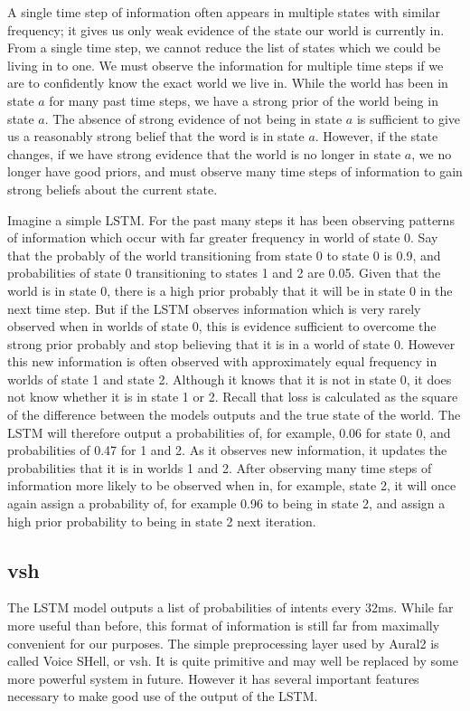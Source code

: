 \documentclass[conference]{IEEEtran}
\begin{document}
A single time step of information often appears in multiple states with similar frequency; it gives us only weak evidence of the state our world is currently in.
From a single time step, we cannot reduce the list of states which we could be living in to one.
We must observe the information for multiple time steps if we are to confidently know the exact world we live in.
While the world has been in state $a$ for many past time steps, we have a strong prior of the world being in state $a$.
The absence of strong evidence of not being in state $a$ is sufficient to give us a reasonably strong belief that the word is in state $a$.
However, if the state changes, if we have strong evidence that the world is no longer in state $a$, we no longer have good priors, and must observe many time steps of information to gain strong beliefs about the current state.

Imagine a simple LSTM.
For the past many steps it has been observing patterns of information which occur with far greater frequency in world of state 0.
Say that the probably of the world transitioning from state 0 to state 0 is 0.9, and probabilities of state 0 transitioning to states 1 and 2 are 0.05.
Given that the world is in state 0, there is a high prior probably that it will be in state 0 in the next time step.
But if the LSTM observes information which is very rarely observed when in worlds of state 0, this is evidence sufficient to overcome the strong prior probably and stop believing that it is in a world of state 0.
However this new information is often observed with approximately equal frequency in worlds of state 1 and state 2.
Although it knows that it is not in state 0, it does not know whether it is in state 1 or 2.
Recall that loss is calculated as the square of the difference between the models outputs and the true state of the world.
The LSTM will therefore output a probabilities of, for example, 0.06 for state 0, and probabilities of 0.47 for 1 and 2.
As it observes new information, it updates the probabilities that it is in worlds 1 and 2.
After observing many time steps of information more likely to be observed when in, for example, state 2, it will once again assign a probability of, for example 0.96 to being in state 2, and assign a high prior probability to being in state 2 next iteration.

\subsection{vsh}
The LSTM model outputs a list of probabilities of intents every 32ms.
While far more useful than before, this format of information is still far from maximally convenient for our purposes.
The simple preprocessing layer used by Aural2 is called Voice SHell, or vsh.
It is quite primitive and may well be replaced by some more powerful system in future.
However it has several important features necessary to make good use of the output of the LSTM.
\end{document}
